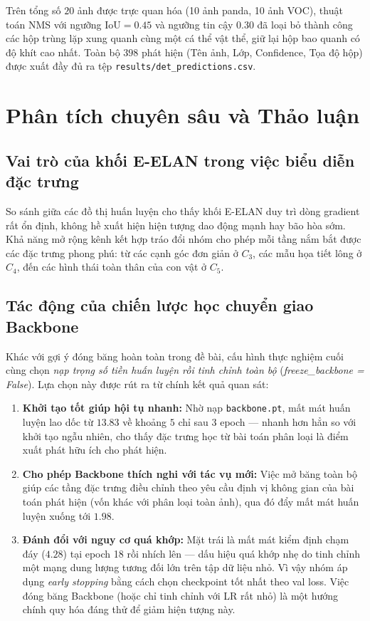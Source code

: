 \documentclass[fontsize=13pt,a4paper,oneside,DIV=calc,chapterprefix=true]{scrbook}
\begin{document}
Trên tổng số $20$ ảnh được trực quan hóa (10 ảnh panda, 10 ảnh VOC), thuật toán NMS với ngưỡng $\mathrm{IoU} = 0.45$ và ngưỡng tin cậy $0.30$ đã loại bỏ thành công các hộp trùng lặp xung quanh cùng một cá thể vật thể, giữ lại hộp bao quanh có độ khít cao nhất. Toàn bộ $398$ phát hiện (Tên ảnh, Lớp, Confidence, Tọa độ hộp) được xuất đầy đủ ra tệp \texttt{results/det\_predictions.csv}.

\section{Phân tích chuyên sâu và Thảo luận}
\subsection{Vai trò của khối E-ELAN trong việc biểu diễn đặc trưng}
So sánh giữa các đồ thị huấn luyện cho thấy khối E-ELAN duy trì dòng gradient rất ổn định, không hề xuất hiện hiện tượng dao động mạnh hay bão hòa sớm. Khả năng mở rộng kênh kết hợp tráo đổi nhóm cho phép mỗi tầng nắm bắt được các đặc trưng phong phú: từ các cạnh góc đơn giản ở $C_3$, các mẫu họa tiết lông ở $C_4$, đến các hình thái toàn thân của con vật ở $C_5$.

\subsection{Tác động của chiến lược học chuyển giao Backbone}
Khác với gợi ý đóng băng hoàn toàn trong đề bài, cấu hình thực nghiệm cuối cùng chọn \textit{nạp trọng số tiền huấn luyện rồi tinh chỉnh toàn bộ} (\textit{freeze\_backbone = False}). Lựa chọn này được rút ra từ chính kết quả quan sát:
\begin{enumerate}[leftmargin=1.2cm]
    \item \textbf{Khởi tạo tốt giúp hội tụ nhanh:} Nhờ nạp \texttt{backbone.pt}, mất mát huấn luyện lao dốc từ $13.83$ về khoảng $5$ chỉ sau 3 epoch --- nhanh hơn hẳn so với khởi tạo ngẫu nhiên, cho thấy đặc trưng học từ bài toán phân loại là điểm xuất phát hữu ích cho phát hiện.
    \item \textbf{Cho phép Backbone thích nghi với tác vụ mới:} Việc mở băng toàn bộ giúp các tầng đặc trưng điều chỉnh theo yêu cầu định vị không gian của bài toán phát hiện (vốn khác với phân loại toàn ảnh), qua đó đẩy mất mát huấn luyện xuống tới $1.98$.
    \item \textbf{Đánh đổi với nguy cơ quá khớp:} Mặt trái là mất mát kiểm định chạm đáy ($4.28$) tại epoch 18 rồi nhích lên --- dấu hiệu quá khớp nhẹ do tinh chỉnh một mạng dung lượng tương đối lớn trên tập dữ liệu nhỏ. Vì vậy nhóm áp dụng \textit{early stopping} bằng cách chọn checkpoint tốt nhất theo val loss. Việc đóng băng Backbone (hoặc chỉ tinh chỉnh với LR rất nhỏ) là một hướng chính quy hóa đáng thử để giảm hiện tượng này.
\end{enumerate}
\end{document}
